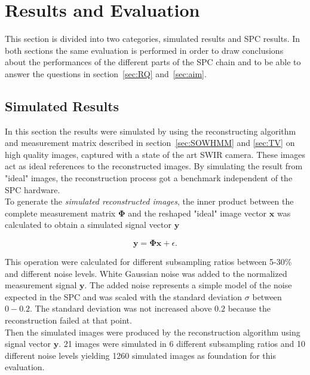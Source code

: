 \chapter{Results and Evaluation}
\label{sec:Evaluation} 
This section is divided into two categories, simulated results and SPC results. In both sections the same evaluation is performed in order to draw conclusions about the performances of the different parts of the SPC chain and to be able to answer the questions in section~\ref{sec:RQ} and~\ref{sec:aim}.\\[0.1in]



\section{Simulated Results}
\label{sec:simulated_results}
In this section the results were simulated by using the reconstructing algorithm and measurement matrix described in section~\ref{sec:SOWHMM} and \ref{sec:TV} on high quality images, captured with a state of the art SWIR camera. These images act as ideal references to the reconstructed images. By simulating the result from "ideal" images, the reconstruction process got a benchmark independent of the SPC hardware.\\[0.1in]

To generate the \textit{simulated reconstructed images}, the inner product between the complete measurement matrix $\mathbf{\Phi}$ and the reshaped "ideal" image vector $\mathbf{x}$ was calculated to obtain a simulated signal vector $\mathbf{y}$

\begin{equation}
\mathbf{y} = \mathbf{\Phi}\mathbf{x} + \epsilon.
\end{equation} 
 
This operation were calculated for different subsampling ratios between 5-30\% and different noise levels. White Gaussian noise was added to the normalized measurement signal $\mathbf{y}$. The added noise represents a simple model of the noise expected in the SPC and was scaled with the standard deviation $\sigma$ between $0 - 0.2$. The standard deviation was not increased above $0.2$ because the reconstruction failed at that point. \\[0.1in] 

Then the simulated images were produced by the reconstruction algorithm using signal vector $\mathbf{y}$. 21 images were simulated in 6 different subsampling ratios and 10 different noise levels yielding 1260 simulated images as foundation for this evaluation.

